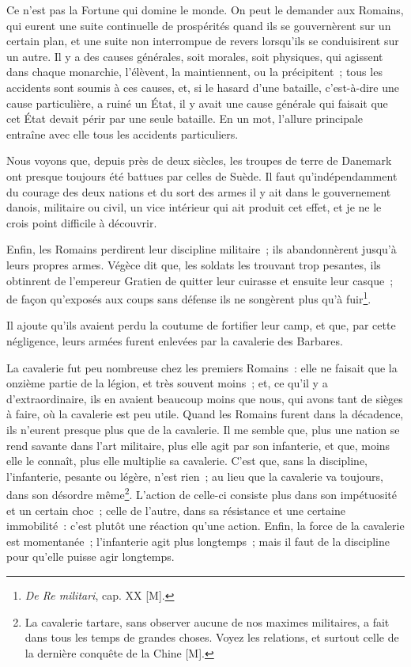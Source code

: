 \documentclass[french,twoside]{book} %
\begin{document}
Ce n’est pas la Fortune qui domine le monde. On peut le demander aux Romains, qui eurent une suite continuelle de prospérités quand ils se gouvernèrent sur un certain plan, et une suite non interrompue de revers lorsqu’ils se conduisirent sur un autre. Il y a des causes générales, soit morales, soit physiques, qui agissent dans chaque monarchie, l’élèvent, la maintiennent, ou la précipitent ; tous les accidents sont soumis à ces causes, et, si le hasard d’une bataille, c’est-à-dire une cause particulière, a ruiné un État, il y avait une cause générale qui faisait que cet État devait périr par une seule bataille. En un mot, l’allure principale entraîne avec elle tous les accidents particuliers.\par
Nous voyons que, depuis près de deux siècles, les troupes de terre de Danemark ont presque toujours été battues par celles de Suède. Il faut qu’indépendamment du courage des deux nations et du sort des armes il y ait dans le gouvernement danois, militaire ou civil, un vice intérieur qui ait produit cet effet, et je ne le crois point difficile à découvrir.\par
Enfin, les Romains perdirent leur discipline militaire ; ils abandonnèrent jusqu’à leurs propres armes. Végèce dit que, les soldats les trouvant trop pesantes, ils obtinrent de l’empereur Gratien de quitter leur cuirasse et ensuite leur casque ; de façon qu’exposés aux coups sans défense ils ne songèrent plus qu’à fuir\footnote{{\itshape De Re militari}, cap. XX [M].}.\par
Il ajoute qu’ils avaient perdu la coutume de fortifier leur camp, et que, par cette négligence, leurs armées furent enlevées par la cavalerie des Barbares.\par
La cavalerie fut peu nombreuse chez les premiers Romains : elle ne faisait que la onzième partie de la légion, et très souvent moins ; et, ce qu’il y a d’extraordinaire, ils en avaient beaucoup moins que nous, qui avons tant de sièges à faire, où la cavalerie est peu utile. Quand les Romains furent dans la décadence, ils n’eurent presque plus que de la cavalerie. Il me semble que, plus une nation se rend savante dans l’art militaire, plus elle agit par son infanterie, et que, moins elle le connaît, plus elle multiplie sa cavalerie. C’est que, sans la discipline, l’infanterie, pesante ou légère, n’est rien ; au lieu que la cavalerie va toujours, dans son désordre même\footnote{La cavalerie tartare, sans observer aucune de nos maximes militaires, a fait dans tous les temps de grandes choses. Voyez les relations, et surtout celle de la dernière conquête de la Chine [M].}. L’action de celle-ci consiste plus dans son impétuosité et un certain choc ; celle de l’autre, dans sa résistance et une certaine immobilité : c’est plutôt une réaction qu’une action. Enfin, la force de la cavalerie est momentanée ; l’infanterie agit plus longtemps ; mais il faut de la discipline pour qu’elle puisse agir longtemps.\par
\end{document}
